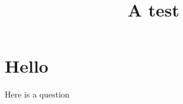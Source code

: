 \documentclass{ximera}
\title{A test}
\begin{document}
\begin{abstract}
\end{abstract}
\maketitle

\section{Hello}

\begin{question}
  Here is a question
  \begin{multipleChoice}
  \end{multipleChoice}
\end{question}
\end{document}
